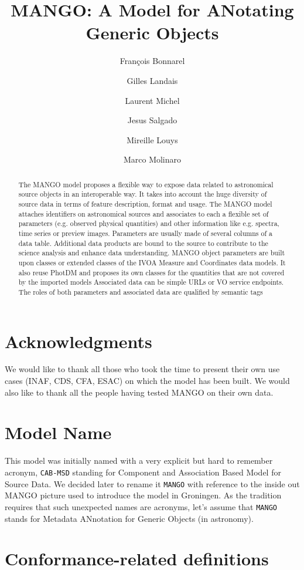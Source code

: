 \documentclass[11pt,a4paper]{ivoa}
\title{MANGO: A Model for ANotating Generic Objects}
\author{François Bonnarel}
\author{Gilles Landais}
\author{Laurent Michel}
\author{Jesus Salgado}
\author{Mireille Louys}
\author{Marco Molinaro}
\begin{document}
\begin{abstract}

The MANGO model proposes a flexible way to expose data related to astronomical source objects 
in an interoperable way.
It takes into account the huge diversity of source data in terms of feature description, format and usage.
The MANGO model attaches identifiers on astronomical sources and associates to each a flexible 
set of parameters (e.g. observed physical quantities) and other information like e.g. spectra,
time series or preview images.
Parameters are usually made of several columns of a data table.
Additional data products are bound to the source to contribute to the science analysis
and enhance data understanding.
MANGO object parameters are built upon classes or extended classes of the IVOA Measure
and Coordinates data models. It also reuse PhotDM and proposes its own classes for the quantities 
that are not covered by the imported models
Associated data can be simple URLs or VO service endpoints.
The roles of both parameters and associated data are qualified by semantic tags

\end{abstract}


\section*{Acknowledgments}

We would like to thank all those who took the time to present their own use cases (INAF, CDS, CFA, ESAC) on which the model has been built.
We would also like to thank all the people having tested MANGO on their own data.

\section*{Model Name}
This model was initially named with a very explicit but hard to remember acronym, \texttt{CAB-MSD}
standing for Component and Association Based Model for Source Data.
We decided later to rename it \texttt{MANGO} with reference to the inside out MANGO
picture used to introduce the model in Groningen. 
As the tradition requires that such unexpected names are acronyms,
let's assume that \texttt{MANGO} stands for
Metadata ANnotation for Generic Objects (in astronomy).


\section*{Conformance-related definitions}
\end{document}
